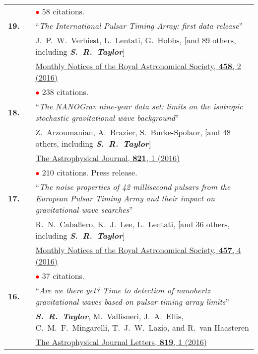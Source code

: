 \documentclass[11pt,letterpaper,sans]{moderncv}
\begin{document}
{\begin{longtable}{rp{0.3cm}p{15.8cm}}
&& \textcolor{red}{$\bullet$} $58$ citations. \vspace{0.09cm}\\
\textbf{19.} & & ``\textit{The International Pulsar Timing Array: first data release}'' \\ 
&& J.~P.~W.~Verbiest, L.~Lentati, G.~Hobbs, [and 89 others, including \textit{\textbf{S.~R.~Taylor}}] \\ 
&&  \href{http://mnras.oxfordjournals.org/content/458/2/1267}{{\color{color1} Monthly Notices of the Royal Astronomical Society, \textbf{458}, 2 (2016)}} \\
&& \textcolor{red}{$\bullet$} $238$ citations. \vspace{0.09cm}\\
\textbf{18.} & & ``\textit{The NANOGrav nine-year data set: limits on the isotropic stochastic gravitational wave background}'' \\ 
&& Z.~Arzoumanian, A.~Brazier, S.~Burke-Spolaor, [and 48 others, including \textit{\textbf{S.~R.~Taylor}}] \\ 
&&  \href{http://iopscience.iop.org/article/10.3847/0004-637X/821/1/13/meta}{{\color{color1} The Astrophysical Journal, \textbf{821}, 1 (2016)}} \\
&& \textcolor{red}{$\bullet$} $210$ citations. Press release. \vspace{0.09cm}\\
\textbf{17.} & & ``\textit{The noise properties of 42 millisecond pulsars from the European Pulsar Timing Array and their impact on gravitational-wave searches}'' \\ 
&& R.~N.~Caballero, K.~J.~Lee, L.~Lentati, [and 36 others, including \textit{\textbf{S.~R.~Taylor}}] \\ 
&&  \href{http://mnras.oxfordjournals.org/content/457/4/4421}{{\color{color1} Monthly Notices of the Royal Astronomical Society, \textbf{457}, 4 (2016)}} \\
&& \textcolor{red}{$\bullet$} $37$ citations. \vspace{0.09cm}\\
\textbf{16.} & & ``\textit{Are we there yet? Time to detection of nanohertz gravitational waves based on pulsar-timing array limits}'' \\ 
&& \textit{\textbf{S.~R.~Taylor}}, M.~Vallisneri, J.~A.~Ellis, C.~M.~F.~Mingarelli, T.~J.~W.~Lazio, and R.~van Haasteren \\ 
&&  \href{http://iopscience.iop.org/article/10.3847/2041-8205/819/1/L6/meta}{{\color{color1} The Astrophysical Journal Letters, \textbf{819}, 1 (2016)}} \\

\end{longtable}}
\end{document}
